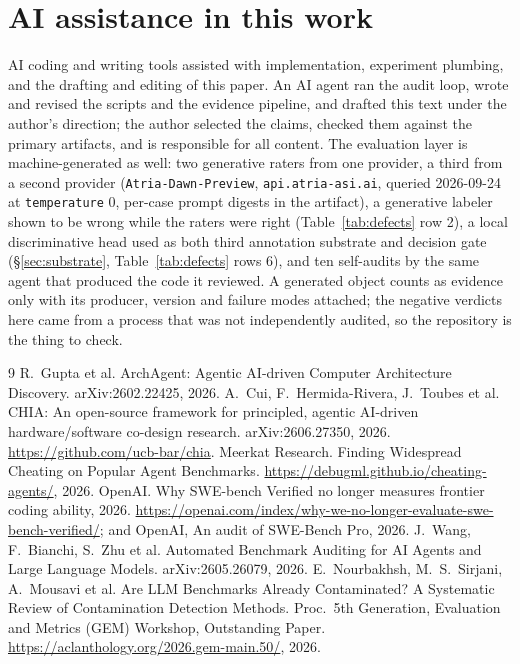 \documentclass[sigconf,anonymous,nonacm]{acmart}
\begin{document}
\section*{AI assistance in this work}
AI coding and writing tools assisted with implementation, experiment plumbing, and the drafting and editing of this paper. An AI agent ran the audit loop, wrote and revised the scripts and the evidence pipeline, and drafted this text under the author's direction; the author selected the claims, checked them against the primary artifacts, and is responsible for all content. The evaluation layer is machine-generated as well: two generative raters from one provider, a third from a second provider (\texttt{Atria-Dawn-Preview}, \texttt{api.atria-asi.ai}, queried 2026-09-24 at \texttt{temperature} 0, per-case prompt digests in the artifact), a generative labeler shown to be wrong while the raters were right (Table~\ref{tab:defects} row 2), a local discriminative head used as both third annotation substrate and decision gate (\S\ref{sec:substrate}, Table~\ref{tab:defects} rows 6), and ten self-audits by the same agent that produced the code it reviewed. A generated object counts as evidence only with its producer, version and failure modes attached; the negative verdicts here came from a process that was not independently audited, so the repository is the thing to check.


\begin{thebibliography}{9}\scriptsize
{} R.\ Gupta et al. ArchAgent: Agentic AI-driven Computer Architecture Discovery. arXiv:2602.22425, 2026.
 A.\ Cui, F.\ Hermida-Rivera, J.\ Toubes et al. CHIA: An open-source framework for principled, agentic AI-driven hardware/software co-design research. arXiv:2606.27350, 2026. \url{https://github.com/ucb-bar/chia}.
 Meerkat Research. Finding Widespread Cheating on Popular Agent Benchmarks. \url{https://debugml.github.io/cheating-agents/}, 2026.
 OpenAI. Why SWE-bench Verified no longer measures frontier coding ability, 2026. \url{https://openai.com/index/why-we-no-longer-evaluate-swe-bench-verified/}; and OpenAI, An audit of SWE-Bench Pro, 2026.
 J.\ Wang, F.\ Bianchi, S.\ Zhu et al. Automated Benchmark Auditing for AI Agents and Large Language Models. arXiv:2605.26079, 2026.
 E.\ Nourbakhsh, M.\ S.\ Sirjani, A.\ Mousavi et al. Are LLM Benchmarks Already Contaminated? A Systematic Review of Contamination Detection Methods. Proc.\ 5th Generation, Evaluation and Metrics (GEM) Workshop, Outstanding Paper. \url{https://aclanthology.org/2026.gem-main.50/}, 2026.
\end{thebibliography}
\end{document}

